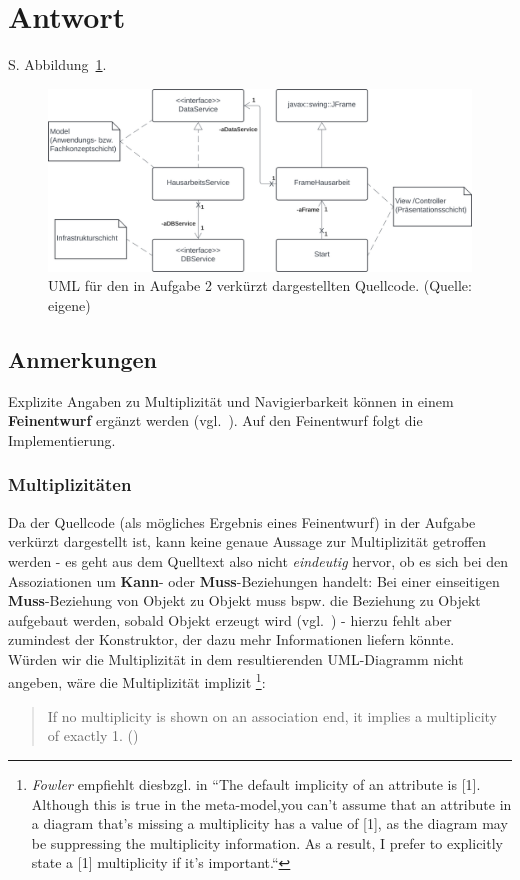 \section*{Antwort}

S. Abbildung~\ref{fig:aufgabe2}.\\

\begin{figure}
    \centering
    \includegraphics[scale=0.35]{chapters/aufgabe 2/img/aufgabe2}
    \caption{UML für den in Aufgabe 2 verkürzt dargestellten Quellcode. (Quelle: eigene)}
    \label{fig:aufgabe2}
\end{figure}

\subsection*{Anmerkungen}
Explizite Angaben zu Multiplizität und Navigierbarkeit können in einem \textbf{Feinentwurf} ergänzt werden (vgl.~\cite[415]{Bal05}). Auf den Feinentwurf folgt die Implementierung.\\

\subsubsection*{Multiplizitäten}
Da der Quellcode (als mögliches Ergebnis eines Feinentwurf) in der Aufgabe verkürzt dargestellt ist, kann keine genaue Aussage zur Multiplizität getroffen werden - es geht aus dem Quelltext also nicht \textit{eindeutig} hervor, ob es sich bei den Assoziationen um \textbf{Kann}- oder \textbf{Muss}-Beziehungen handelt: Bei einer einseitigen \textbf{Muss}-Beziehung von Objekt  zu Objekt  muss bspw. die Beziehung zu Objekt  aufgebaut werden, sobald Objekt  erzeugt wird (vgl.~\cite[43]{Bal05}) - hierzu fehlt aber zumindest der Konstruktor, der dazu mehr Informationen liefern könnte.\\

\noindent
Würden wir die Multiplizität in dem resultierenden UML-Diagramm nicht angeben, wäre die Multiplizität implizit \code{[1]}\footnote{
    \textit{Fowler} empfiehlt diesbzgl. in \cite[39]{Fow03b} ``The default implicity of an attribute is [1]. Although this is true in the meta-model,you can't assume that an attribute in a diagram that's missing a multiplicity has a value of [1], as the diagram may be suppressing the multiplicity information. As a result, I prefer to explicitly state a [1] multiplicity if it's important.``
    }:
\blockquote[{\cite[19]{OMG17}}]{
If no multiplicity is shown on an association end, it implies a multiplicity of exactly 1. (\cite[19]{OMG17})
}.

